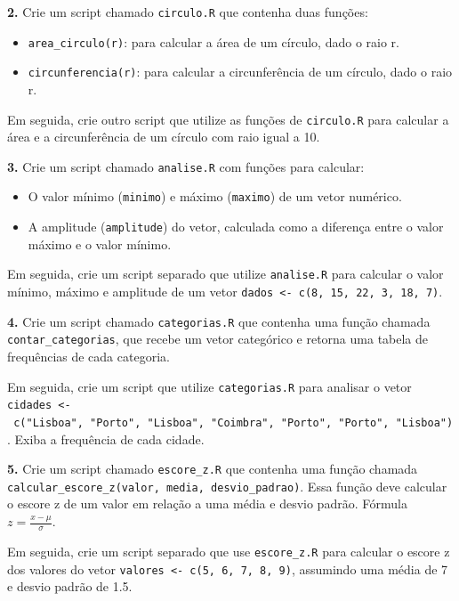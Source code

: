 \documentclass[
]{book}
\providecommand{\tightlist}{%
  \setlength{\itemsep}{0pt}\setlength{\parskip}{0pt}}
\begin{document}
\textbf{2.} Crie um script chamado \texttt{circulo.R} que contenha duas funções:

\begin{itemize}
\item
  \texttt{area\_circulo(r)}: para calcular a área de um círculo, dado o raio r.
\item
  \texttt{circunferencia(r)}: para calcular a circunferência de um círculo, dado o raio r.
\end{itemize}

Em seguida, crie outro script que utilize as funções de \texttt{circulo.R} para calcular a área e a circunferência de um círculo com raio igual a 10.

\textbf{3.} Crie um script chamado \texttt{analise.R} com funções para calcular:

\begin{itemize}
\tightlist
\item
  O valor mínimo (\texttt{minimo}) e máximo (\texttt{maximo}) de um vetor numérico.
\item
  A amplitude (\texttt{amplitude}) do vetor, calculada como a diferença entre o valor máximo e o valor mínimo.
\end{itemize}

Em seguida, crie um script separado que utilize \texttt{analise.R} para calcular o valor mínimo, máximo e amplitude de um vetor \texttt{dados\ \textless{}-\ c(8,\ 15,\ 22,\ 3,\ 18,\ 7)}.

\textbf{4.} Crie um script chamado \texttt{categorias.R} que contenha uma função chamada \texttt{contar\_categorias}, que recebe um vetor categórico e retorna uma tabela de frequências de cada categoria.

Em seguida, crie um script que utilize \texttt{categorias.R} para analisar o vetor \texttt{cidades\ \textless{}-\ c("Lisboa",\ "Porto",\ "Lisboa",\ "Coimbra",\ "Porto",\ "Porto",\ "Lisboa")}. Exiba a frequência de cada cidade.

\textbf{5.} Crie um script chamado \texttt{escore\_z.R} que contenha uma função chamada \texttt{calcular\_escore\_z(valor,\ media,\ desvio\_padrao)}. Essa função deve calcular o escore z de um valor em relação a uma média e desvio padrão. Fórmula \(z = \frac{x-\mu}{\sigma}\).

Em seguida, crie um script separado que use \texttt{escore\_z.R} para calcular o escore z dos valores do vetor \texttt{valores\ \textless{}-\ c(5,\ 6,\ 7,\ 8,\ 9)}, assumindo uma média de 7 e desvio padrão de 1.5.
\end{document}
